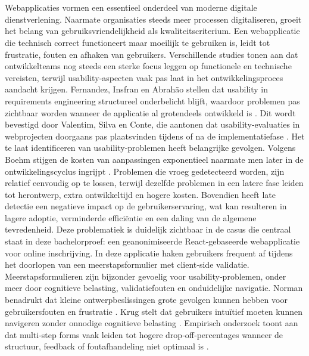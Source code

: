
\chapter{}%
\label{ch:inleiding}
Webapplicaties vormen een essentieel onderdeel van moderne digitale dienstverlening. Naarmate organisaties steeds meer processen digitaliseren, groeit het belang van gebruiksvriendelijkheid als kwaliteitscriterium. Een webapplicatie die technisch correct functioneert maar moeilijk te gebruiken is, leidt tot frustratie, fouten en afhaken van gebruikers. Verschillende studies tonen aan dat ontwikkelteams nog steeds een sterke focus leggen op functionele en technische vereisten, terwijl usability‑aspecten vaak pas laat in het ontwikkelingsproces aandacht krijgen. Fernandez, Insfran en Abrahão stellen dat usability in requirements engineering structureel onderbelicht blijft, waardoor problemen pas zichtbaar worden wanneer de applicatie al grotendeels ontwikkeld is \autocite{Fernandez2011}. Dit wordt bevestigd door Valentim, Silva en Conte, die aantonen dat usability‑evaluaties in webprojecten doorgaans pas plaatsvinden tijdens of na de implementatiefase \autocite{Valentim2018}.
Het te laat identificeren van usability‑problemen heeft belangrijke gevolgen. Volgens Boehm stijgen de kosten van aanpassingen exponentieel naarmate men later in de ontwikkelingscyclus ingrijpt \autocite{Boehm1981}. Problemen die vroeg gedetecteerd worden, zijn relatief eenvoudig op te lossen, terwijl dezelfde problemen in een latere fase leiden tot herontwerp, extra ontwikkeltijd en hogere kosten. Bovendien heeft late detectie een negatieve impact op de gebruikerservaring, wat kan resulteren in lagere adoptie, verminderde efficiëntie en een daling van de algemene tevredenheid.
Deze problematiek is duidelijk zichtbaar in de casus die centraal staat in deze bachelorproef: een geanonimiseerde React‑gebaseerde webapplicatie voor online inschrijving. In deze applicatie haken gebruikers frequent af tijdens het doorlopen van een meerstapsformulier met client‑side validatie. Meerstapsformulieren zijn bijzonder gevoelig voor usability‑problemen, onder meer door cognitieve belasting, validatiefouten en onduidelijke navigatie. Norman benadrukt dat kleine ontwerpbeslissingen grote gevolgen kunnen hebben voor gebruikersfouten en frustratie \autocite{Norman2013}. Krug stelt dat gebruikers intuïtief moeten kunnen navigeren zonder onnodige cognitieve belasting \autocite{Krug2014}. Empirisch onderzoek toont aan dat multi‑step forms vaak leiden tot hogere drop‑off‑percentages wanneer de structuur, feedback of foutafhandeling niet optimaal is \autocite{BargasAvila2019}.
